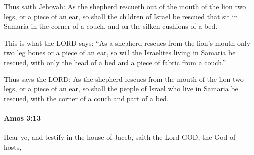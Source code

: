 			\begin{versebox}
					\item[BHS] 
					\item[LXX] 
					\item[ASV] Thus saith Jehovah: As the shepherd rescueth out of the mouth of the lion two legs, or a piece of an ear, so shall the children of Israel be rescued that sit in Samaria in the corner of a couch, and on the silken cushions of a bed.
					\item[NIV] This is what the LORD says: “As a shepherd rescues from the lion’s mouth only two leg bones or a piece of an ear, so will the Israelites living in Samaria be rescued, with only the head of a bed and a piece of fabric from a couch.”
					\item[NRSV] Thus says the LORD: As the shepherd rescues from the mouth of the lion two legs, or a piece of an ear, so shall the people of Israel who live in Samaria be rescued, with the corner of a couch and part of a bed.
			\end{versebox}

		\paragraph{Amos 3:13} %
			\label{AMOS-3-13}

			Hear ye, and testify in the house of Jacob, saith the Lord GOD, the God of hosts,


